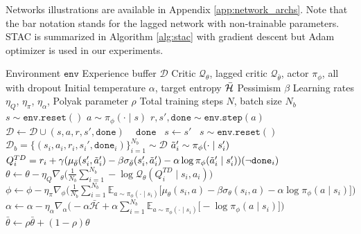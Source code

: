 \documentclass[10pt]{article} %
\begin{document}
Networks illustrations are available in Appendix \ref{app:network_archs}. Note that the bar notation stands for the lagged network with non-trainable parameters. STAC is summarized in Algorithm \ref{alg:stac} with gradient descent but Adam optimizer \citep{kingma2014adam} is used in our experiments. 

\begin{algorithm}
	\caption{Stochastic Actor-Critic}
	\label{alg:stac}
	\begin{algorithmic}
		\Require Environment $\texttt{env}$ 
		\Require Experience buffer $\mathcal{D}$ 
		\Require Critic $\mathcal{Q}_{\theta}$, lagged critic $\mathcal{Q}_{\bar{\theta}}$, actor $\pi_{\phi}$, all with dropout 
		\Require Initial temperature $\alpha$, target entropy $\Bar{\mathcal{H}}$  
		\Require Pessimism $\beta$ 
		\Require Learning rates $\eta_{Q}$, $\eta_{\pi}$, $\eta_{\alpha}$, Polyak parameter $\rho$
		\Require Total training steps $N$, batch size $N_b$
		\State $s \sim \texttt{env.reset}()$ 
		\State $a \sim \pi_{\phi}(\cdot \mid s)$  
		\State $r, s', \texttt{done} \sim \texttt{env.step}(a)$ 
		\State $\mathcal{D} \leftarrow \mathcal{D} \cup (s, a, r, s', \texttt{done})$  
		\State \algorithmicif\ $\texttt{~done}$ \algorithmicthen\ $s \leftarrow s'$ \algorithmicelse\ $s \sim \texttt{env.reset}() $  
		\State $\mathcal{D}_b = \{(s_i, a_i, r_i, s_i', \texttt{done}_i)\}_{i=1}^{N_b}  \sim  \mathcal{D} $  
		\State $\Tilde{a}_{i}'\sim\pi_{\phi}(\cdot \mid s_i')$ 
		\State $Q_i^{TD} = r_i + \gamma (\mu_{\bar{\theta}}(s_i', \Tilde{a}_{i}') - \beta \sigma_{\bar{\theta}}(s_i', \Tilde{a}_{i}') -\alpha \log \pi_{\phi}(\Tilde{a}_{i}' \mid s_i') ) (\neg\texttt{done}_i)$ 
		\State $\theta \leftarrow \theta - \eta_{Q} \nabla_{\theta} \Big( \frac{1}{N_{b}} \sum_{i=1}^{N_b}  - \log{\mathcal{Q}_{\theta} (Q_i^{TD} \mid s_i,a_i)} \Big) $ 
		\State $\phi \leftarrow \phi - \eta_{\pi} \nabla_{\phi} \Big( \frac{1}{N_{b}} \sum_{i=1}^{N_b} \mathbb{E}_{a\sim\pi_{\phi}(\cdot \mid s_i)} \big[ \mu_{\theta}(s_i, a) - \beta \sigma_{\theta}(s_i, a) - \alpha \log{\pi_{\phi}(a \mid s_i)} \big] \Big) $  
		\State $\alpha \leftarrow \alpha - \eta_{\alpha} \nabla_{\alpha} \Big( - \alpha \mathcal{\bar{H}} + \alpha \sum_{i=1}^{N_b} \mathbb{E}_{a\sim\pi_{\phi}(\cdot \mid s_i)} \big[ -\log \pi_{\phi}(a \mid s_i) \big] \Big) $  
		\State $\bar{\theta} \leftarrow \rho \bar{\theta} + (1-\rho) \theta $  
		\EndFor
		\EndFor
		
	\end{algorithmic}
\end{algorithm}
\end{document}

